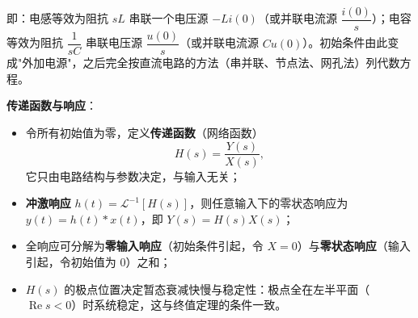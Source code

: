 即：电感等效为阻抗 \(sL\) 串联一个电压源 \(-Li(0)\)（或并联电流源 \(\dfrac{i(0)}{s}\)）；电容等效为阻抗 \(\dfrac{1}{sC}\) 串联电压源 \(\dfrac{u(0)}{s}\)（或并联电流源 \(Cu(0)\)）。初始条件由此变成"外加电源"，之后完全按直流电路的方法（串并联、节点法、网孔法）列代数方程。

\textbf{传递函数与响应}：
\begin{itemize}
    \item 令所有初始值为零，定义\textbf{传递函数}（网络函数）
    \[
    H(s)=\frac{Y(s)}{X(s)},
    \]
    它只由电路结构与参数决定，与输入无关；
    \item \textbf{冲激响应} \(h(t)=\mathscr{L}^{-1}[H(s)]\)，则任意输入下的零状态响应为 \(y(t)=h(t)*x(t)\)，即 \(Y(s)=H(s)X(s)\)；
    \item 全响应可分解为\textbf{零输入响应}（初始条件引起，令 \(X=0\)）与\textbf{零状态响应}（输入引起，令初始值为 0）之和；
    \item \(H(s)\) 的极点位置决定暂态衰减快慢与稳定性：极点全在左半平面（\(\operatorname{Re}s<0\)）时系统稳定，这与终值定理的条件一致。
\end{itemize}


